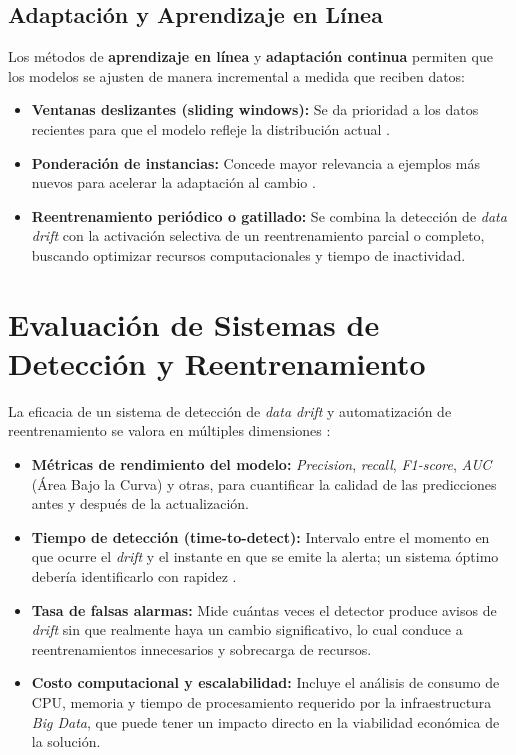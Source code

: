 \subsection{Adaptación y Aprendizaje en Línea}
Los métodos de \textbf{aprendizaje en línea} y \textbf{adaptación continua} permiten que los modelos se ajusten de manera incremental a medida que reciben datos:
\begin{itemize}
    \item \textbf{Ventanas deslizantes (sliding windows):} Se da prioridad a los datos recientes para que el modelo refleje la distribución actual \citep{Kolter2007, Bifet2010}.
    \item \textbf{Ponderación de instancias:} Concede mayor relevancia a ejemplos más nuevos para acelerar la adaptación al cambio \citep{Minku2010}.
    \item \textbf{Reentrenamiento periódico o gatillado:} Se combina la detección de \textit{data drift} con la activación selectiva de un reentrenamiento parcial o completo, buscando optimizar recursos computacionales y tiempo de inactividad.
\end{itemize}

\section{Evaluación de Sistemas de Detección y Reentrenamiento}
La eficacia de un sistema de detección de \textit{data drift} y automatización de reentrenamiento se valora en múltiples dimensiones \citep{Gama2014, Zliobaite2016}:
\begin{itemize}
    \item \textbf{Métricas de rendimiento del modelo:} \textit{Precision}, \textit{recall}, \textit{F1-score}, \textit{AUC} (Área Bajo la Curva) y otras, para cuantificar la calidad de las predicciones antes y después de la actualización.
    \item \textbf{Tiempo de detección (time-to-detect):} Intervalo entre el momento en que ocurre el \textit{drift} y el instante en que se emite la alerta; un sistema óptimo debería identificarlo con rapidez \citep{Sethi2017}.
    \item \textbf{Tasa de falsas alarmas:} Mide cuántas veces el detector produce avisos de \textit{drift} sin que realmente haya un cambio significativo, lo cual conduce a reentrenamientos innecesarios y sobrecarga de recursos.
    \item \textbf{Costo computacional y escalabilidad:} Incluye el análisis de consumo de CPU, memoria y tiempo de procesamiento requerido por la infraestructura \textit{Big Data}, que puede tener un impacto directo en la viabilidad económica de la solución.
\end{itemize}

